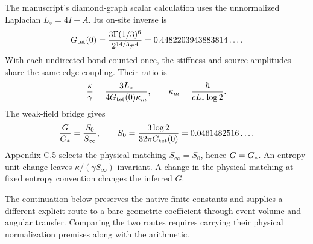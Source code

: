 The manuscript's diamond-graph scalar calculation uses the unnormalized Laplacian $L_\diamond=4I-A$. Its on-site inverse is
\begin{equation}
G_{\rm tet}(0)
=\frac{3\Gamma(1/3)^6}{2^{14/3}\pi^4}
=0.4482203943883814\ldots .
\end{equation}
With each undirected bond counted once, the stiffness and source amplitudes share the same edge coupling. Their ratio is
\begin{equation}
\frac{\kappa}{\gamma}
=\frac{3L_*}{4G_{\rm tet}(0)\kappa_m},
\qquad
\kappa_m=\frac{\hbar}{cL_*\log2}.
\end{equation}
The weak-field bridge gives
\begin{equation}
\frac{G}{G_*}=\frac{S_0}{S_\infty},\qquad
S_0=\frac{3\log2}{32\pi G_{\rm tet}(0)}
=0.0461482516\ldots .
\label{eq:S0}
\end{equation}
Appendix C.5 selects the physical matching $S_\infty=S_0$, hence $G=G_*$. An entropy-unit change leaves $\kappa/(\gamma S_\infty)$ invariant. A change in the physical matching at fixed entropy convention changes the inferred $G$.

The continuation below preserves the native finite constants and supplies a different explicit route to a bare geometric coefficient through event volume and angular transfer. Comparing the two routes requires carrying their physical normalization premises along with the arithmetic.
